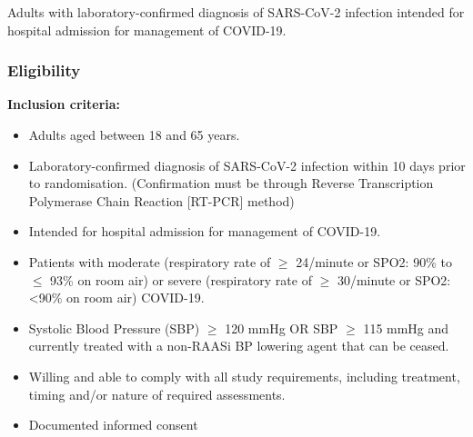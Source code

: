 \documentclass[11pt,parskip=half-]{scrartcl}
\begin{document}
Adults with laboratory-confirmed diagnosis of SARS-CoV-2 infection intended for hospital admission for management of COVID-19.

\subsubsection{Eligibility}
\textbf{Inclusion criteria:}
\begin{itemize}
    \item Adults aged between 18 and 65 years.
    \item Laboratory-confirmed diagnosis of SARS-CoV-2 infection within 10 days prior to randomisation. (Confirmation must be through Reverse Transcription Polymerase Chain Reaction [RT-PCR] method)
    \item Intended for hospital admission for management of COVID-19.
    \item  Patients with moderate (respiratory rate of $\geq$ 24/minute or SPO2: 90\% to $\leq$ 93\% on room air) or severe (respiratory rate of $\geq$ 30/minute or SPO2: <90\% on room air) COVID-19.
    \item  Systolic Blood Pressure (SBP) $\geq$ 120 mmHg OR SBP $\geq$ 115 mmHg and currently treated with a non-RAASi BP lowering agent that can be ceased.
    \item Willing and able to comply with all study requirements, including treatment, timing and/or nature of required assessments.
    \item Documented informed consent
\end{itemize}
\end{document}
